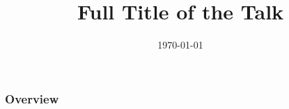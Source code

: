 \documentclass{beamer}
\title[Short title]{Full Title of the Talk}
\author{}
\date{\today}
\begin{document}
\begin{frame}
\titlepage
\end{frame}

\begin{frame}
  \frametitle{Overview}
\tableofcontents
\end{frame}
\end{document}
